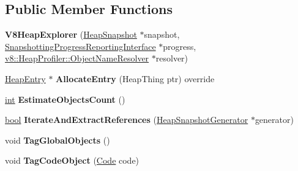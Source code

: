 \subsection*{Public Member Functions}
\begin{DoxyCompactItemize}
\item 
\mbox{\label{classv8_1_1internal_1_1V8HeapExplorer_a380cad4a97cc6608f02640026ef32441}} 
{\bfseries V8\+Heap\+Explorer} (\mbox{\hyperlink{classv8_1_1internal_1_1HeapSnapshot}{Heap\+Snapshot}} $\ast$snapshot, \mbox{\hyperlink{classv8_1_1internal_1_1SnapshottingProgressReportingInterface}{Snapshotting\+Progress\+Reporting\+Interface}} $\ast$progress, \mbox{\hyperlink{classv8_1_1HeapProfiler_1_1ObjectNameResolver}{v8\+::\+Heap\+Profiler\+::\+Object\+Name\+Resolver}} $\ast$resolver)
\item 
\mbox{\label{classv8_1_1internal_1_1V8HeapExplorer_a6695e91c59d50a8d8d8f47d7c89fe7fb}} 
\mbox{\hyperlink{classv8_1_1internal_1_1HeapEntry}{Heap\+Entry}} $\ast$ {\bfseries Allocate\+Entry} (Heap\+Thing ptr) override
\item 
\mbox{\label{classv8_1_1internal_1_1V8HeapExplorer_a217a37b1c9d73867805d6881784f189d}} 
\mbox{\hyperlink{classint}{int}} {\bfseries Estimate\+Objects\+Count} ()
\item 
\mbox{\label{classv8_1_1internal_1_1V8HeapExplorer_aff3a17723e9ea1c85248d70a57b357d7}} 
\mbox{\hyperlink{classbool}{bool}} {\bfseries Iterate\+And\+Extract\+References} (\mbox{\hyperlink{classv8_1_1internal_1_1HeapSnapshotGenerator}{Heap\+Snapshot\+Generator}} $\ast$generator)
\item 
\mbox{\label{classv8_1_1internal_1_1V8HeapExplorer_a3fc89ba6b31b1f48e4ce026976eeaf79}} 
void {\bfseries Tag\+Global\+Objects} ()
\item 
\mbox{\label{classv8_1_1internal_1_1V8HeapExplorer_ab9a5128c03dc5b3c708afda56c3366ef}} 
void {\bfseries Tag\+Code\+Object} (\mbox{\hyperlink{classv8_1_1internal_1_1Code}{Code}} code)
\item 
\mbox{\label{classv8_1_1internal_1_1V8HeapExplorer_a681f71584651bf8ab63dcfa812086a1b}} 

\end{DoxyCompactItemize}
